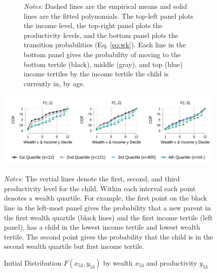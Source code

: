 \documentclass[12pt]{article}
\begin{document}
\begin{figure}
\begin{subfigure}{\textwidth}
		{\begin{footnotesize}\textit{Notes:}
			Dashed lines are the empirical means and solid lines are the fitted polynomials. The top-left panel plots the income level, the top-right panel plots the productivity levels, and the bottom panel plots the transition probabilities (Eq. \ref{eq:wk}). Each line in the bottom panel gives the probability of moving to the bottom tertile (black), middle (gray), and top (blue) income tertiles by the income tertile the child is currently in, by age. \end{footnotesize}\vspace{0.05in}}
	\end{subfigure}
\end{figure}

\begin{figure}\caption{Initial Distribution $F(x_{53},y_{53})$ by wealth $x_{53}$ and productivity $y_{53}$}\label{fig:inidistr}
		
		\includegraphics[width=1\textwidth]{../tabfig/empirical/inidistr} 
		{\begin{footnotesize}\textit{Notes:} The vertial lines denote the first, second, and third productivity level for the child. Within each interval each point denotes a wealth quartile. For example, the first point on the black line in the left-most panel gives the probability that a new parent in the first wealth quartile (black lines) and the first income tertile (left panel), has a child in the lowest income tertile and lowest wealth tertile. The second point gives the probability that the child is in the second wealth quartile but first income tertile. \end{footnotesize}}
\end{figure}
\end{document}
